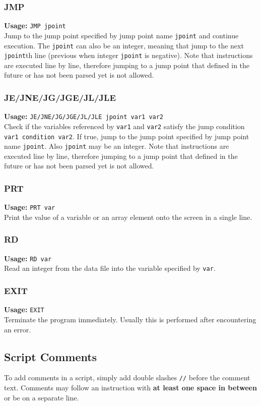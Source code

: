\documentclass[11pt]{article}
\begin{document}
\subsubsection{JMP}
{\bf Usage:} {\tt JMP jpoint}\\
Jump to the jump point specified by jump point name {\tt jpoint} and continue execution. The {\tt jpoint} can also be an integer, meaning that jump to the next {\tt jpoint}th line (previous when integer {\tt jpoint} is negative). Note that instructions are executed line by line, therefore jumping to a jump point that defined in the future or has not been parsed yet is not allowed.
\subsubsection{JE/JNE/JG/JGE/JL/JLE}
{\bf Usage:} {\tt JE/JNE/JG/JGE/JL/JLE jpoint var1 var2}\\
Check if the variables referenced by {\tt var1} and {\tt var2} satisfy the jump condition {\tt var1 condition var2}. If true, jump to the jump point specified by jump point name {\tt jpoint}. Also {\tt jpoint} may be an integer. Note that instructions are executed line by line, therefore jumping to a jump point that defined in the future or has not been parsed yet is not allowed.
\subsubsection{PRT}
{\bf Usage:} {\tt PRT var}\\
Print the value of a variable or an array element onto the screen in a single line.
\subsubsection{RD}
{\bf Usage:} {\tt RD var}\\
Read an integer from the data file into the variable specified by {\tt var}.
\subsubsection{EXIT}
{\bf Usage:} {\tt EXIT}\\
Terminate the program immediately. Usually this is performed after encountering an error.

\subsection{Script Comments}
To add comments in a script, simply add double slashes {\tt //} before the comment text. Comments may follow an instruction with {\bf at least one space in between} or be on a separate line. 
\end{document}
